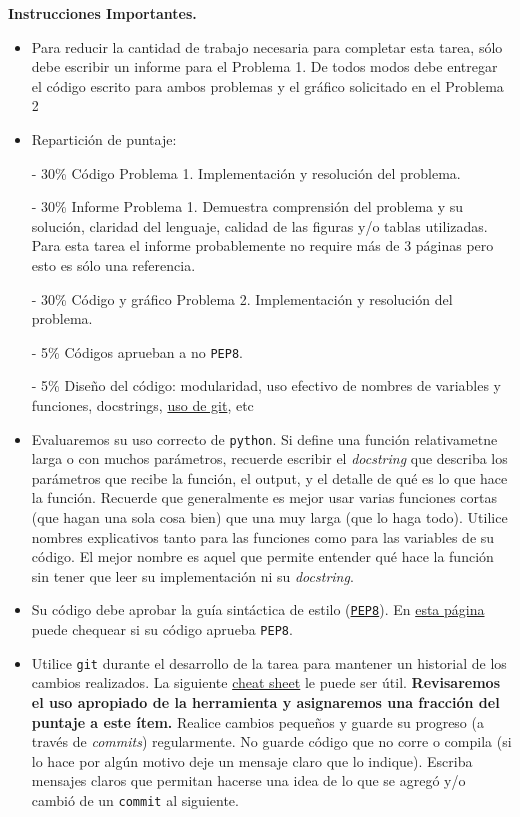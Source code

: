 \documentclass[letter, 11pt]{article}
\begin{document}
\vspace{2em}
\noindent\textbf{Instrucciones Importantes.}
\begin{itemize}

\item Para reducir la cantidad de trabajo necesaria para completar esta tarea,
  sólo debe escribir un informe para el Problema 1. De todos modos debe
  entregar el código escrito para ambos problemas y el gráfico solicitado en el
  Problema 2

 \item Repartición de puntaje:

   \subitem - 30\% Código Problema 1. Implementación y resolución del problema.
     
    \subitem - 30\% Informe Problema 1. Demuestra comprensión del problema y su
    solución, claridad del lenguaje, calidad de las figuras y/o tablas
    utilizadas. Para esta tarea el informe probablemente no require más de 3
    páginas pero esto es sólo una referencia.

    \subitem - 30\% Código y gráfico Problema 2. Implementación y resolución
    del problema.

    \subitem - 5\% Códigos aprueban a no \texttt{PEP8}.

    \subitem - 5\% Diseño del código: modularidad, uso efectivo de nombres de
    variables y funciones, docstrings, \underline{uso de git}, etc


\item Evaluaremos su uso correcto de \texttt{python}. Si define una función
  relativametne larga o con muchos parámetros, recuerde escribir el
  \emph{docstring} que describa los parámetros que recibe la función, el
  output, y el detalle de qué es lo que hace la función. Recuerde que
  generalmente es mejor usar varias funciones cortas (que hagan una sola cosa
  bien) que una muy larga (que lo haga todo).  Utilice nombres explicativos
  tanto para las funciones como para las variables de su código. El mejor
  nombre es aquel que permite entender qué hace la función sin tener que leer
  su implementación ni su \emph{docstring}.

\item Su código debe aprobar la guía sintáctica de estilo
  (\href{https://www.python.org/dev/peps/pep-0008/}{\texttt{PEP8}}). En
  \href{http://pep8online.com}{esta página} puede chequear si su código aprueba
  \texttt{PEP8}.

\item Utilice \texttt{git} durante el desarrollo de la tarea para mantener un
  historial de los cambios realizados. La siguiente
  \href{https://education.github.com/git-cheat-sheet-education.pdf}{cheat
    sheet} le puede ser útil. {\bf Revisaremos el uso apropiado de la
  herramienta y asignaremos una fracción del puntaje a este ítem.} Realice
  cambios pequeños y guarde su progreso (a través de \emph{commits})
  regularmente. No guarde código que no corre o compila (si lo hace por algún
  motivo deje un mensaje claro que lo indique). Escriba mensajes claros que
  permitan hacerse una idea de lo que se agregó y/o cambió de un
  \texttt{commit} al siguiente.


\end{itemize}
\end{document}
